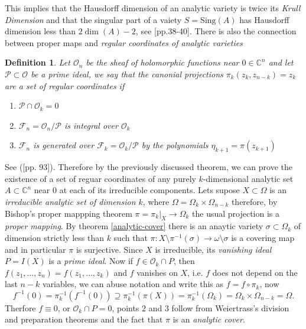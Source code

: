 \documentclass[12pt,twoside,a4paper]{report}
\newtheorem{definition}{Definition}[section]
\newcommand{\con}{\ensuremath{\mathbb{C}^n}}
\newcommand{\om}{\ensuremath{\Omega}}
\newcommand{\osheaf}{\ensuremath{\mathcal O }}
\newcommand{\psheaf}{\ensuremath{\mathcal P }}
\begin{document}
  This implies that the Hausdorff dimension of an analytic variety is twice its \emph{Krull Dimension} and that the singular part of a vaiety $S=\mathrm{Sing}(A)$ has Hausdorff dimension less than $2\dim(A)-2$, see \cite{Chirka}[pp.38-40]. There is also the connection between proper maps and \emph{regular coordinates of analytic varieties}

  \begin{definition}
  Let $\osheaf_{n}$ be the sheaf of holomorphic functions near $0\in\con$ and let $\psheaf\subset\osheaf$ be a prime ideal, we say that the canonial projections $\pi_{k}(z_{k},z_{n-k})=z_{k}$ are a set of \emph{regular coordinates} if
      \begin{enumerate}
        \item[1] $\mathcal{P}\cap\osheaf_{k}=0$
        \item[2] $\mathcal{F}_{n}=\osheaf_{n}/\mathcal{P}$ is integral over $\mathcal{O}_{k}$
        \item[3] $\mathcal{F}_{n}$ is generated over $\mathcal{F}_{k}=\osheaf_{k}/\mathcal{P}$ by the polynomials $\eta_{k+1}=\pi(z_{k+1})$
      \end{enumerate}
    \end{definition}
    See (\cite{Gunning-Rossi}[pp. 93]). Therefore by the previously discussed theorem, we can prove the existence of a set of reguar coordinates of any purely $k$-dimensional analytic set $A\subset\con$ near $0$ at each of its irreducible components. Lets supose $X\subset\om$ is an \emph{irreducible analytic set of dimension \(k\)}, where $\om=\om_{k}\times\om_{n-k}$ therefore, by Bishop's proper mappping theorem \(\pi=\pi_{k}|_{X}\to\om_{k}\) the usual projection is a \emph{proper mapping}. By theorem \ref{analytic-cover} there  is an anaytic variety $\sigma\subset\om_{k}$ of dimension strictly less than $k$ such that $\pi:X\setminus\pi^{-1}(\sigma)\to\omega\setminus\sigma$ is a covering map and in particular $\pi$ is surjective. Since $X$ is irreducible, its \emph{vanishing ideal} $P=I(X)$ is a \emph{prime ideal}. Now if $f\in\osheaf_{k}\cap P$, then $f(z_{1},\dots,z_{n})=f(z_{1},\dots,z_{k})$ and $f$ vanishes on $X$, i.e. $f$ does not depend on the last $n-k$ variables, we can abuse notation and write this as $f=f\circ\pi_{k}$, now
    \[
      f^{-1}(0)=\pi_{k}^{-1}(f^{-1}(0))\supseteq\pi_{k}^{-1}(\pi(X))=\pi_{k}^{-1}(\om_{k})=\om_{k}\times\om_{n-k}=\om.
    \]
    Therfore $f\equiv0$, or $\osheaf_{k}\cap P=0$, points $2$ and $3$ follow from Weiertrass's division and preparation theorems and the fact that $\pi$ is an \emph{analytic cover}.
\end{document}
